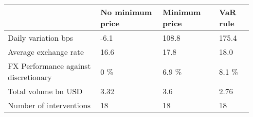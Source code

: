 \begin{tabular}{llll}
\toprule
{} & No minimum price & Minimum price & VaR rule \\
\midrule
Daily variation bps                  &             -6.1 &         108.8 &    175.4 \\
Average exchange rate                &             16.6 &          17.8 &     18.0 \\
FX Performance against discretionary &              0 \% &         6.9 \% &    8.1 \% \\
Total volume bn USD                  &             3.32 &           3.6 &     2.76 \\
Number of interventions              &               18 &            18 &       18 \\
\bottomrule
\end{tabular}
